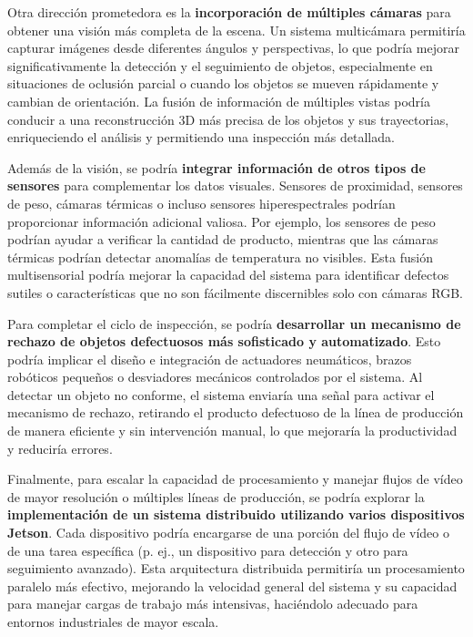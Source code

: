 \documentclass[11pt,spanish,listoffigures,listoftables]{tfgetsinf}
\begin{document}
Otra dirección prometedora es la \textbf{incorporación de múltiples cámaras} para obtener una visión más completa de la escena. Un sistema multicámara permitiría capturar imágenes desde diferentes ángulos y perspectivas, lo que podría mejorar significativamente la detección y el seguimiento de objetos, especialmente en situaciones de oclusión parcial o cuando los objetos se mueven rápidamente y cambian de orientación. La fusión de información de múltiples vistas podría conducir a una reconstrucción 3D más precisa de los objetos y sus trayectorias, enriqueciendo el análisis y permitiendo una inspección más detallada.

Además de la visión, se podría \textbf{integrar información de otros tipos de sensores} para complementar los datos visuales. Sensores de proximidad, sensores de peso, cámaras térmicas o incluso sensores hiperespectrales podrían proporcionar información adicional valiosa. Por ejemplo, los sensores de peso podrían ayudar a verificar la cantidad de producto, mientras que las cámaras térmicas podrían detectar anomalías de temperatura no visibles. Esta fusión multisensorial podría mejorar la capacidad del sistema para identificar defectos sutiles o características que no son fácilmente discernibles solo con cámaras RGB.

Para completar el ciclo de inspección, se podría \textbf{desarrollar un mecanismo de rechazo de objetos defectuosos más sofisticado y automatizado}. Esto podría implicar el diseño e integración de actuadores neumáticos, brazos robóticos pequeños o desviadores mecánicos controlados por el sistema. Al detectar un objeto no conforme, el sistema enviaría una señal para activar el mecanismo de rechazo, retirando el producto defectuoso de la línea de producción de manera eficiente y sin intervención manual, lo que mejoraría la productividad y reduciría errores.

Finalmente, para escalar la capacidad de procesamiento y manejar flujos de vídeo de mayor resolución o múltiples líneas de producción, se podría explorar la \textbf{implementación de un sistema distribuido utilizando varios dispositivos Jetson}. Cada dispositivo podría encargarse de una porción del flujo de vídeo o de una tarea específica (p. ej., un dispositivo para detección y otro para seguimiento avanzado). Esta arquitectura distribuida permitiría un procesamiento paralelo más efectivo, mejorando la velocidad general del sistema y su capacidad para manejar cargas de trabajo más intensivas, haciéndolo adecuado para entornos industriales de mayor escala.
\end{document}
